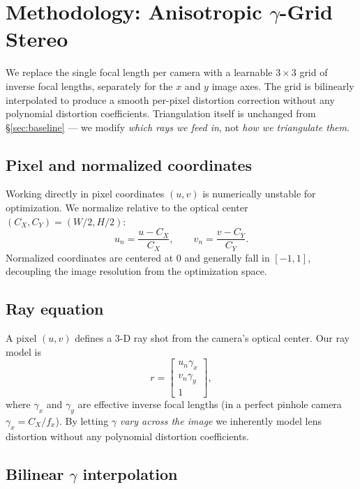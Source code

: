 \documentclass[11pt]{article}
\begin{document}
\section{Methodology: Anisotropic $\gamma$-Grid Stereo}
\label{sec:method}

We replace the single focal length per camera with a learnable $3 \times 3$ grid of
inverse focal lengths, separately for the $x$ and $y$ image axes. The grid is bilinearly
interpolated to produce a smooth per-pixel distortion correction without any polynomial
distortion coefficients. Triangulation itself is unchanged from \S\ref{sec:baseline} ---
we modify \emph{which rays we feed in}, not \emph{how we triangulate them}.

\subsection{Pixel and normalized coordinates}

Working directly in pixel coordinates $(u, v)$ is numerically unstable for optimization.
We normalize relative to the optical center $(C_X, C_Y) = (W/2, H/2)$:
\begin{equation}
u_n = \frac{u - C_X}{C_X}, \qquad v_n = \frac{v - C_Y}{C_Y}.
\label{eq:norm}
\end{equation}
Normalized coordinates are centered at $0$ and generally fall in $[-1, 1]$, decoupling the
image resolution from the optimization space.

\subsection{Ray equation}

A pixel $(u, v)$ defines a 3-D ray shot from the camera's optical center. Our ray model is
\begin{equation}
r = \begin{bmatrix} u_n \gamma_x \\ v_n \gamma_y \\ 1 \end{bmatrix},
\label{eq:ray}
\end{equation}
where $\gamma_x$ and $\gamma_y$ are effective inverse focal lengths (in a perfect pinhole
camera $\gamma_x = C_X / f_x$). By letting $\gamma$ \emph{vary across the image} we
inherently model lens distortion without any polynomial distortion coefficients.

\subsection{Bilinear $\gamma$ interpolation}
\end{document}
